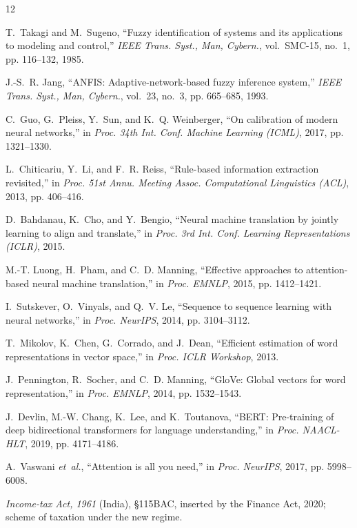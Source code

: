 \documentclass[conference]{IEEEtran}
\begin{document}
\balance
\begin{thebibliography}{12}

T.~Takagi and M.~Sugeno, ``Fuzzy identification of systems and its
applications to modeling and control,'' \emph{IEEE Trans. Syst., Man,
Cybern.}, vol.~SMC-15, no.~1, pp. 116--132, 1985.

J.-S.~R. Jang, ``ANFIS: Adaptive-network-based fuzzy inference
system,'' \emph{IEEE Trans. Syst., Man, Cybern.}, vol.~23, no.~3,
pp. 665--685, 1993.

C.~Guo, G.~Pleiss, Y.~Sun, and K.~Q. Weinberger, ``On calibration of
modern neural networks,'' in \emph{Proc. 34th Int. Conf. Machine
Learning (ICML)}, 2017, pp. 1321--1330.

L.~Chiticariu, Y.~Li, and F.~R. Reiss, ``Rule-based information
extraction revisited,'' in \emph{Proc. 51st Annu. Meeting Assoc.
Computational Linguistics (ACL)}, 2013, pp. 406--416.

D.~Bahdanau, K.~Cho, and Y.~Bengio, ``Neural machine translation by
jointly learning to align and translate,'' in \emph{Proc. 3rd Int.
Conf. Learning Representations (ICLR)}, 2015.

M.-T. Luong, H.~Pham, and C.~D. Manning, ``Effective approaches to
attention-based neural machine translation,'' in \emph{Proc. EMNLP},
2015, pp. 1412--1421.

I.~Sutskever, O.~Vinyals, and Q.~V. Le, ``Sequence to sequence
learning with neural networks,'' in \emph{Proc. NeurIPS}, 2014,
pp. 3104--3112.

T.~Mikolov, K.~Chen, G.~Corrado, and J.~Dean, ``Efficient estimation
of word representations in vector space,'' in \emph{Proc. ICLR
Workshop}, 2013.

J.~Pennington, R.~Socher, and C.~D. Manning, ``GloVe: Global vectors
for word representation,'' in \emph{Proc. EMNLP}, 2014,
pp. 1532--1543.

J.~Devlin, M.-W. Chang, K.~Lee, and K.~Toutanova, ``BERT:
Pre-training of deep bidirectional transformers for language
understanding,'' in \emph{Proc. NAACL-HLT}, 2019, pp. 4171--4186.

A.~Vaswani \emph{et~al.}, ``Attention is all you need,'' in
\emph{Proc. NeurIPS}, 2017, pp. 5998--6008.

\emph{Income-tax Act, 1961} (India), \S115BAC, inserted by the
Finance Act, 2020; scheme of taxation under the new regime.

\end{thebibliography}
\end{document}
